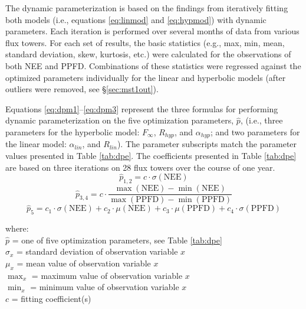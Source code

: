 The dynamic parameterization is based on the findings from iteratively fitting both models (i.e., equations \ref{eq:linmod} and \ref{eq:hypmod}) with dynamic parameters.  
Each iteration is performed over several months of data from various flux towers.  
For each set of results, the basic statistics (e.g., max, min, mean, standard deviation, skew, kurtosis, etc.) were calculated for the observations of both NEE and PPFD.  
Combinations of these statistics were regressed against the optimized parameters individually for the linear and hyperbolic models (after outliers were removed, see \S \ref{sec:mst1out}).

Equations \ref{eq:dpm1}--\ref{eq:dpm3} represent the three formulas for performing dynamic parameterization on the five optimization parameters, $\hat{p}$, (i.e., three parameters for the hyperbolic model: $F_{\infty}$, $R_{hyp}$, and $\alpha_{hyp}$; and two parameters for the linear model: $\alpha_{lin}$, and $R_{lin}$).  
The parameter subscripts match the parameter values presented in Table \ref{tab:dpe}.  
The coefficients presented in Table \ref{tab:dpe} are based on three iterations on 28 flux towers over the course of one year.
\begin{equation}
\label{eq:dpm1}
    \hat{p}_{1,2} = c \cdot \sigma\left(\text{NEE}\right)
\end{equation}
\begin{equation}
\label{eq:dpm2}
    \hat{p}_{3,4} = c \cdot \frac{\max\left(\text{NEE}\right)
    -\min\left(\text{NEE}\right)}{\max\left(\text{PPFD}\right)
    -\min\left(\text{PPFD}\right)}
\end{equation}
\begin{equation}
\label{eq:dpm3}
    \hat{p}_{5} = c_{1} \cdot \sigma\left(\text{NEE}\right) 
    + c_{2} \cdot \mu\left(\text{NEE}\right) 
    + c_{3} \cdot \mu\left(\text{PPFD}\right) 
    + c_{4} \cdot \sigma\left(\text{PPFD}\right)
\end{equation}

\noindent where:\\
\indent $\hat{p}$ = one of five optimization parameters, 
                    see Table \ref{tab:dpe}\\
\indent $\sigma_{x}$ = standard deviation of observation variable $x$ \\
\indent $\mu_{x}$ = mean value of observation variable $x$\\
\indent $\max_{x}$ = maximum value of observation variable $x$\\
\indent $\min_{x}$ = minimum value of observation variable $x$\\
\indent $c$ = fitting coefficient(s)

